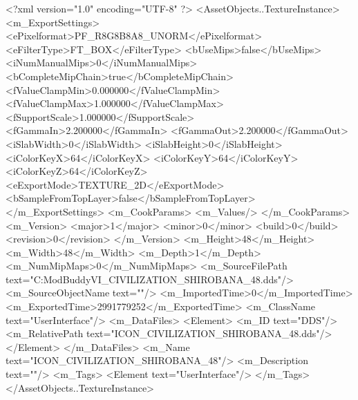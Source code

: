 <?xml version="1.0" encoding="UTF-8" ?>
<AssetObjects..TextureInstance>
	<m_ExportSettings>
		<ePixelformat>PF_R8G8B8A8_UNORM</ePixelformat>
		<eFilterType>FT_BOX</eFilterType>
		<bUseMips>false</bUseMips>
		<iNumManualMips>0</iNumManualMips>
		<bCompleteMipChain>true</bCompleteMipChain>
		<fValueClampMin>0.000000</fValueClampMin>
		<fValueClampMax>1.000000</fValueClampMax>
		<fSupportScale>1.000000</fSupportScale>
		<fGammaIn>2.200000</fGammaIn>
		<fGammaOut>2.200000</fGammaOut>
		<iSlabWidth>0</iSlabWidth>
		<iSlabHeight>0</iSlabHeight>
		<iColorKeyX>64</iColorKeyX>
		<iColorKeyY>64</iColorKeyY>
		<iColorKeyZ>64</iColorKeyZ>
		<eExportMode>TEXTURE_2D</eExportMode>
		<bSampleFromTopLayer>false</bSampleFromTopLayer>
	</m_ExportSettings>
	<m_CookParams>
		<m_Values/>
	</m_CookParams>
	<m_Version>
		<major>1</major>
		<minor>0</minor>
		<build>0</build>
		<revision>0</revision>
	</m_Version>
	<m_Height>48</m_Height>
	<m_Width>48</m_Width>
	<m_Depth>1</m_Depth>
	<m_NumMipMaps>0</m_NumMipMaps>
	<m_SourceFilePath text="C:\Users\asus\Documents\Firaxis ModBuddy\Civilization VI\temppic\ICON_CIVILIZATION_SHIROBANA_48.dds"/>
	<m_SourceObjectName text=""/>
	<m_ImportedTime>0</m_ImportedTime>
	<m_ExportedTime>2991779252</m_ExportedTime>
	<m_ClassName text="UserInterface"/>
	<m_DataFiles>
		<Element>
			<m_ID text="DDS"/>
			<m_RelativePath text="ICON_CIVILIZATION_SHIROBANA_48.dds"/>
		</Element>
	</m_DataFiles>
	<m_Name text="ICON_CIVILIZATION_SHIROBANA_48"/>
	<m_Description text=""/>
	<m_Tags>
		<Element text="UserInterface"/>
	</m_Tags>
</AssetObjects..TextureInstance>

